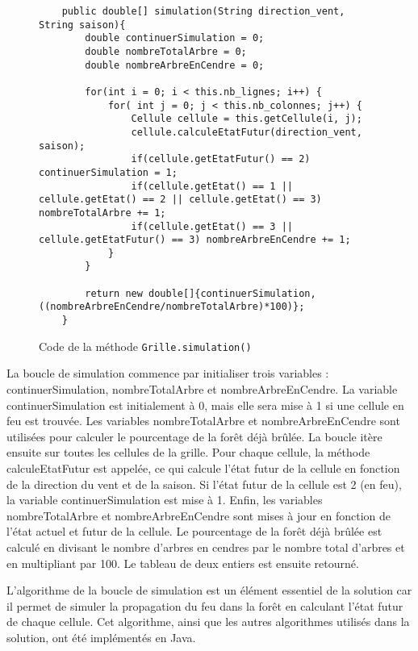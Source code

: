 \begin{figure}[htbp]
    \centering
    \begin{lstlisting}
    public double[] simulation(String direction_vent, String saison){
        double continuerSimulation = 0;
        double nombreTotalArbre = 0;
        double nombreArbreEnCendre = 0;

        for(int i = 0; i < this.nb_lignes; i++) {
            for( int j = 0; j < this.nb_colonnes; j++) {
                Cellule cellule = this.getCellule(i, j);
                cellule.calculeEtatFutur(direction_vent, saison);
                if(cellule.getEtatFutur() == 2) continuerSimulation = 1;
                if(cellule.getEtat() == 1 || cellule.getEtat() == 2 || cellule.getEtat() == 3) nombreTotalArbre += 1;
                if(cellule.getEtat() == 3 || cellule.getEtatFutur() == 3) nombreArbreEnCendre += 1;
            }
        }

        return new double[]{continuerSimulation, ((nombreArbreEnCendre/nombreTotalArbre)*100)};
    }
    \end{lstlisting}
    \caption{Code de la méthode \texttt{Grille.simulation()}}
    \label{fig:boucleSimulation}
\end{figure}

La boucle de simulation commence par initialiser trois variables : continuerSimulation, nombreTotalArbre et nombreArbreEnCendre. La variable continuerSimulation est initialement à 0, mais elle sera mise à 1 si une cellule en feu est trouvée. Les variables nombreTotalArbre et nombreArbreEnCendre sont utilisées pour calculer le pourcentage de la forêt déjà brûlée. La boucle itère ensuite sur toutes les cellules de la grille. Pour chaque cellule, la méthode calculeEtatFutur est appelée, ce qui calcule l'état futur de la cellule en fonction de la direction du vent et de la saison. Si l'état futur de la cellule est 2 (en feu), la variable continuerSimulation est mise à 1. Enfin, les variables nombreTotalArbre et nombreArbreEnCendre sont mises à jour en fonction de l'état actuel et futur de la cellule. Le pourcentage de la forêt déjà brûlée est calculé en divisant le nombre d'arbres en cendres par le nombre total d'arbres et en multipliant par 100. Le tableau de deux entiers est ensuite retourné.

L'algorithme de la boucle de simulation est un élément essentiel de la solution car il permet de simuler la propagation du feu dans la forêt en calculant l'état futur de chaque cellule. Cet algorithme, ainsi que les autres algorithmes utilisés dans la solution, ont été implémentés en Java.


